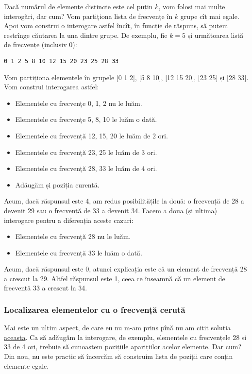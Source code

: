 Dacă numărul de elemente distincte este cel puțin $k$, vom folosi mai multe interogări, dar cum? Vom partiționa lista de frecvențe în $k$ grupe cît mai egale. Apoi vom construi o interogare astfel încît, în funcție de răspuns, să putem restrînge căutarea la una dintre grupe. De exemplu, fie $k=5$ și următoarea listă de frecvențe (inclusiv 0):

\begin{verbatim}
0 1 2 5 8 10 12 15 20 23 25 28 33
\end{verbatim}

Vom partiționa elementele în grupele [0 1 2], [5 8 10], [12 15 20], [23 25] și [28 33]. Vom construi interogarea astfel:

\begin{itemize}
  \item Elementele cu frecvențe 0, 1, 2 nu le luăm.
  \item Elementele cu frecvențe 5, 8, 10 le luăm o dată.
  \item Elementele cu frecvență 12, 15, 20 le luăm de 2 ori.
  \item Elementele cu frecvență 23, 25 le luăm de 3 ori.
  \item Elementele cu frecvență 28, 33 le luăm de 4 ori.
  \item Adăugăm și poziția curentă.
\end{itemize}

Acum, dacă răspunsul este 4, am redus posibilitățile la două: o frecvență de 28 a devenit 29 sau o frecvență de 33 a devenit 34. Facem a doua (și ultima) interogare pentru a diferenția aceste cazuri:

\begin{itemize}
  \item Elementele cu frecvență 28 nu le luăm.
  \item Elementele cu frecvență 33 le luăm o dată.
\end{itemize}

Acum, dacă răspunsul este 0, atunci explicația este că un element de frecvență 28 a crescut la 29. Altfel răspunsul este 1, ceea ce înseamnă că un element de frecvență 33 a crescut la 34.

\subsubsection*{Localizarea elementelor cu o frecvență cerută}

Mai este un ultim aspect, de care eu nu m-am prins pînă nu am citit \href{https://kilonova.ro/submissions/761967}{soluția aceasta}. Ca să adăugăm la interogare, de exemplu, elementele cu frecvențele 28 și 33 de 4 ori, trebuie să cunoaștem pozițiile aparițiilor acelor elemente. Dar cum? Din nou, nu este practic să încercăm să construim lista de poziții care conțin elemente egale.


